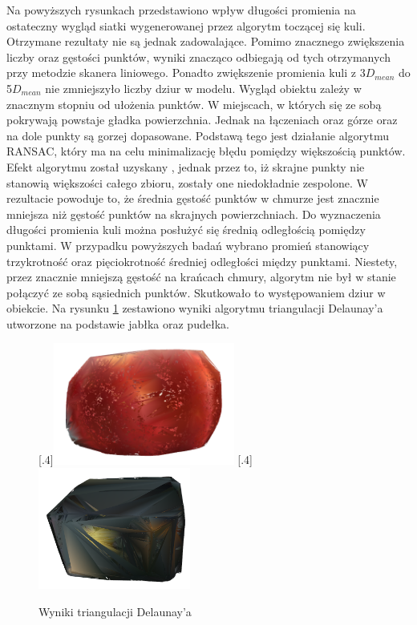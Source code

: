 Na powyższych rysunkach przedstawiono wpływ długości promienia na ostateczny wygląd siatki wygenerowanej przez algorytm toczącej się kuli. Otrzymane rezultaty nie są jednak zadowalające. Pomimo znacznego zwiększenia liczby oraz gęstości punktów, wyniki znacząco odbiegają od tych otrzymanych przy metodzie skanera liniowego. Ponadto zwiększenie promienia kuli z 3$D_{mean}$ do 5$D_{mean}$ nie zmniejszyło liczby dziur w modelu. Wygląd obiektu zależy w znacznym stopniu od ułożenia punktów. W miejscach, w których się ze sobą pokrywają powstaje gładka powierzchnia. Jednak na łączeniach oraz górze oraz na dole punkty są gorzej dopasowane. Podstawą tego jest działanie algorytmu RANSAC, który ma na celu minimalizację błędu pomiędzy większością punktów. Efekt algorytmu został uzyskany , jednak przez to, iż skrajne punkty nie stanowią większości całego zbioru, zostały one niedokładnie zespolone. W rezultacie powoduje to, że średnia gęstość punktów w chmurze jest znacznie mniejsza niż gęstość punktów na skrajnych powierzchniach. Do wyznaczenia długości promienia kuli można posłużyć się średnią odległością pomiędzy punktami. W przypadku powyższych badań wybrano promień stanowiący trzykrotność oraz pięciokrotność średniej odległości między punktami. Niestety, przez znacznie mniejszą gęstość na krańcach chmury, algorytm nie był w stanie połączyć ze sobą sąsiednich punktów. Skutkowało to występowaniem dziur w obiekcie.
\newline \indent Na rysunku \ref{fig:globalRegisterDelaunayAppleBox} zestawiono wyniki algorytmu triangulacji Delaunay'a utworzone na podstawie jabłka oraz pudełka.
\begin{figure}[H]
\centering
{}%
  [.4\linewidth]{\includegraphics[height=4cm]{delaunay_apple_global_45.PNG}}
  [.4\linewidth]{\includegraphics[height=4cm]{delaunay_box_global_45.PNG}} 
\caption{Wyniki triangulacji Delaunay'a}\label{fig:globalRegisterDelaunayAppleBox}
\end{figure}
